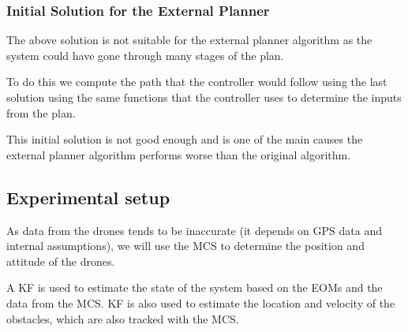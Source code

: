 \subsubsection{Initial Solution for the External Planner}
The above solution is not suitable for the external planner algorithm as the system could have gone through many stages of the plan.

To do this we compute the path that the controller would follow using the last solution using the same functions that the controller uses to determine the inputs from the plan. 

This initial solution is not good enough and is one of the main causes the external planner algorithm performs worse than the original algorithm.

\subsection{Experimental setup}
\label{subsect::experimental_setup}
As data from the drones tends to be inaccurate (it depends on GPS data and internal assumptions), we will use the \ac{MCS} to determine the position and attitude of the drones. 

A \ac{KF} is used to estimate the state of the system based on the \ac{EOMs} and the data from the \ac{MCS}. \ac{KF} is also used to estimate the location and velocity of the obstacles, which are also tracked with the \ac{MCS}.

